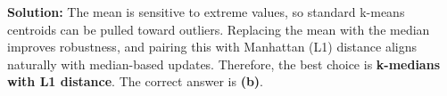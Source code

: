 \documentclass{article}
\begin{document}
\begin{enumerate}
\textbf{Solution:} \newline
The mean is sensitive to extreme values, so standard k-means centroids can be pulled
toward outliers. Replacing the mean with the median improves robustness, and pairing
this with Manhattan (L1) distance aligns naturally with median-based updates.
Therefore, the best choice is \textbf{k-medians with L1 distance}. The correct answer is \textbf{(b)}.
    
\end{enumerate}
\end{document}
